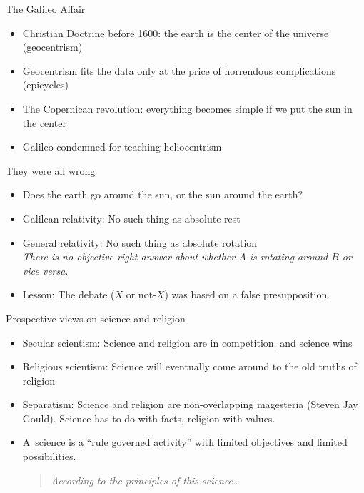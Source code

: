 \documentclass{beamer}
\begin{document}
\begin{frame}{The Galileo Affair}

\begin{itemize}
\item Christian Doctrine before 1600: the earth is the center of the
  universe (geocentrism)
\item Geocentrism fits the data only at the price of horrendous
  complications (epicycles)
\item The Copernican revolution: everything becomes simple if we put
  the sun in the center
\item Galileo condemned for teaching heliocentrism
\end{itemize}

\end{frame}

\begin{frame}{They were all wrong}

\begin{itemize}
\item Does the earth go around the sun, or the sun around the earth?
\item Galilean relativity: No such thing as absolute rest
\item General relativity: No such thing as absolute rotation \\
\smallskip  \emph{There is no objective right answer about whether $A$ is
    rotating around $B$ or vice versa}.
\item Lesson: The debate ($X$ or not-$X$) was based on a false
  presupposition.
\end{itemize}

\end{frame}



\begin{frame}{Prospective views on science and religion}

\begin{itemize}
\item Secular scientism: Science and religion are in competition, and
  science wins
\item Religious scientism: Science will eventually come around to the
  old truths of religion
\item Separatism: Science and religion are non-overlapping magesteria
  (Steven Jay Gould).  Science has to do with facts, religion with
  values.
\item A~science is a ``rule governed activity'' with limited
  objectives and limited possibilities.  \begin{quote} \emph{According
      to the principles of this science\dots } \end{quote}
\end{itemize}


\end{frame}
\end{document}
